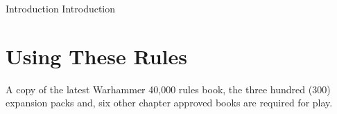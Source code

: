 \begin{chaptercover}{Introduction}
  {Introduction}

\section{Using These Rules}
A copy of the latest Warhammer 40,000 rules book, the three hundred (300) expansion packs and, six other chapter
approved books are required for play.

\end{chaptercover}
